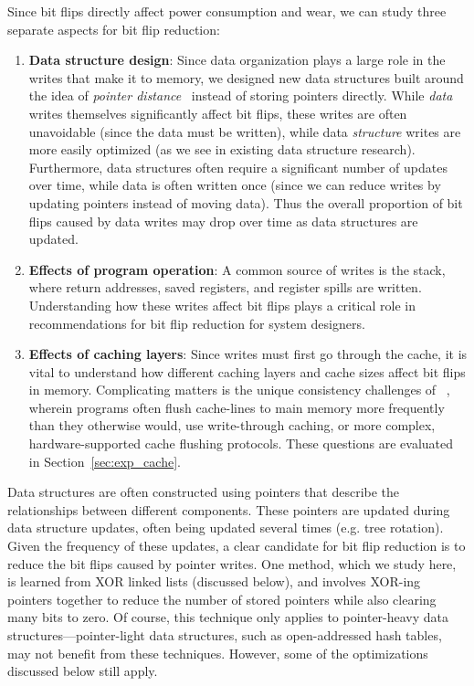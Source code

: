 Since bit flips directly affect power consumption and wear, we
can study three separate aspects for bit flip reduction:
\begin{enumerate}
	\item \textbf{Data structure design}: Since data organization plays a large role
	      in the writes that make it to memory, we designed new data structures built
	      around the idea of \textit{pointer distance}~\cite{xorll} instead of storing
	      pointers directly. While \emph{data} writes themselves significantly affect bit flips, these writes
	      are often unavoidable (since the data must be written), while data \emph{structure} writes are more
	      easily optimized (as we see in existing \NVM data structure research).
	      Furthermore, data structures often require a significant number of updates
	      over time, while data is often written once (since we can reduce writes by updating pointers instead
	      of moving data). Thus the overall proportion of bit flips caused by data writes may drop over time as
	      data structures are updated.
	\item \textbf{Effects of program operation}: A common source of writes is
	      the stack, where return addresses, saved registers, and
	      register spills are written. Understanding how these writes affect bit flips
	      plays a critical role in recommendations for bit flip reduction for system designers.
	\item \textbf{Effects of caching layers}: Since writes must first go through the
	      cache, it is vital to understand how different caching layers and cache sizes
	      affect bit flips in memory. Complicating matters is the unique consistency
	      challenges of \NVM~\cite{coburn:asplos11,volos:asplos11,condit:sosp09}, wherein programs often flush cache-lines to main
	      memory more frequently than they otherwise would, use write-through caching, or
	      more complex, hardware-supported cache flushing protocols. These questions are evaluated in
	      Section~\ref{sec:exp_cache}.
\end{enumerate}

	Data structures are often constructed using pointers that describe the
	relationships between different components. These pointers are updated during
	data structure updates, often being updated several times (e.g. tree rotation).
	Given the frequency of these updates, a clear candidate for bit flip reduction
	is to reduce the bit flips caused by pointer writes. One method, which we study
	here, is learned from XOR linked lists (discussed below), and involves XOR-ing
	pointers together to reduce the number of stored pointers while also clearing
	many bits to zero.  Of course, this technique only applies to pointer-heavy data
	structures---pointer-light data structures, such as open-addressed hash tables,
	may not benefit from these techniques. However, some of the optimizations
	discussed below still apply.
\fi
